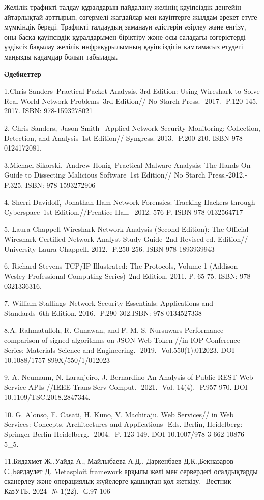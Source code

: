 \begin{multicols}{2}
Желілік трафикті талдау құралдарын пайдалану желінің қауіпсіздік
деңгейін айтарлықтай арттырып, өзгермелі жағдайлар мен қауіптерге жылдам
әрекет етуге мүмкіндік береді. Трафикті талдаудың заманауи әдістерін
әзірлеу және енгізу, оны басқа қауіпсіздік құралдарымен біріктіру және
осы саладағы өзгерістерді үздіксіз бақылау желілік инфрақұрылымның
қауіпсіздігін қамтамасыз етудегі маңызды қадамдар болып табылады.
\end{multicols}

\begin{center}
{\bfseries Әдебиеттер}
\end{center}

\begin{noparindent}
1.Chris Sanders~Practical Packet Analysis, 3rd Edition: Using Wireshark
to Solve Real-World Network Problems~3rd Edition// No Starch Press.
-2017.- P.120-145, 2017. ISBN: 978-1593278021

2. Chris Sanders,~Jason Smith~ Applied Network Security Monitoring:
Collection, Detection, and Analysis~1st Edition// Syngress.-2013.-
P.200-210. ISBN 978-0124172081.

3.Michael Sikorski,~Andrew Honig~Practical Malware Analysis: The
Hands-On Guide to Dissecting Malicious Software~1st Edition// No Starch
Press.-2012.-P.325. ISBN: 978-1593272906

4. Sherri Davidoff,~Jonathan Ham Network Forensics: Tracking Hackers
through Cyberspace~1st Edition.//Prentice Hall. -2012.-576 P. ISBN
978-0132564717

5. Laura Chappell Wireshark Network Analysis (Second Edition): The
Official Wireshark Certified Network Analyst Study Guide~2nd Revised ed.
Edition// University Laura Chappell.-2012.- P.250-256. ISBN
978-1893939943

6. Richard Stevens TCP/IP Illustrated: The Protocols, Volume 1
(Addison-Wesley Professional Computing Series)~2nd Edition.-2011.-P.
65-75. ISBN: 978-0321336316.

7. William Stallings~Network Security Essentials: Applications and
Standards~6th Edition.-2016.- P.290-302.ISBN: 978-0134527338

8.A. Rahmatulloh, R. Gunawan, and F. M. S. Nursuwars Performance
comparison of signed algorithms on JSON Web Token //in IOP Conference
Series: Materials Science and Engineering.- 2019.- Vol.550(1):012023.
DOI 10.1088/1757-899X/550/1/012023

9. A. Neumann, N. Laranjeiro, J. Bernardino An Analysis of Public REST
Web Service APIs //IEEE Trans Serv Comput.- 2021.- Vol. 14(4).-
P.957-970. DOI 10.1109/TSC.2018.2847344.

10. G. Alonso, F. Casati, H. Kuno, V. Machiraju. Web Services// in Web
Services: Concepts, Architectures and Applications- Eds. Berlin,
Heidelberg: Springer Berlin Heidelberg.- 2004.- P. 123-149. DOI
10.1007/978-3-662-10876-5\_5.

11.Бидахмет Ж.,Уайда А., Майлыбаева А.Д., Даркенбаев Д.К.,Бекназаров
С.,Бағдаулет Д. Metasploit framework арқылы желі мен сервердегі
осалдықтарды сканерлеу және операциялық жүйелерге қашықтан қол жеткізу.-
Вестник КазУТБ.-2024- № 1(22).- С.97-106
\end{noparindent}


